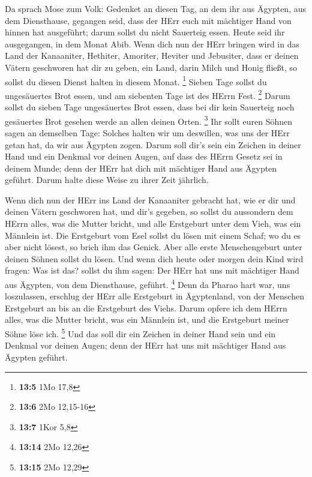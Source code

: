  Da sprach Mose zum Volk: Gedenket an diesen Tag, an dem ihr
aus Ägypten, aus dem Diensthause, gegangen seid, dass der HErr euch mit
mächtiger Hand von hinnen hat ausgeführt; darum sollst du nicht
Sauerteig essen.  Heute seid ihr ausgegangen, in dem Monat
Abib.  Wenn dich nun der HErr bringen wird in das Land der
Kanaaniter, Hethiter, Amoriter, Heviter und Jebusiter, dass er deinen
Vätern geschworen hat dir zu geben, ein Land, darin Milch und Honig
fließt, so sollst du diesen Dienst halten in diesem Monat. \footnote{\textbf{13:5}
  1Mo 17,8}  Sieben Tage sollst du ungesäuertes Brot essen,
und am siebenten Tage ist des HErrn Fest. \footnote{\textbf{13:6} 2Mo
  12,15-16}  Darum sollst du sieben Tage ungesäuertes Brot
essen, dass bei dir kein Sauerteig noch gesäuertes Brot gesehen werde an
allen deinen Orten. \footnote{\textbf{13:7} 1Kor 5,8}  Ihr
sollt euren Söhnen sagen an demselben Tage: Solches halten wir um
deswillen, was uns der HErr getan hat, da wir aus Ägypten zogen.
 Darum soll dir's sein ein Zeichen in deiner Hand und ein
Denkmal vor deinen Augen, auf dass des HErrn Gesetz sei in deinem Munde;
denn der HErr hat dich mit mächtiger Hand aus Ägypten geführt.
 Darum halte diese Weise zu ihrer Zeit jährlich.

 Wenn dich nun der HErr ins Land der Kanaaniter gebracht
hat, wie er dir und deinen Vätern geschworen hat, und dir's gegeben,
 so sollst du aussondern dem HErrn alles, was die Mutter
bricht, und alle Erstgeburt unter dem Vieh, was ein Männlein ist.
 Die Erstgeburt vom Esel sollst du lösen mit einem Schaf;
wo du es aber nicht lösest, so brich ihm das Genick. Aber alle erste
Menschengeburt unter deinen Söhnen sollst du lösen.  Und
wenn dich heute oder morgen dein Kind wird fragen: Was ist das? sollst
du ihm sagen: Der HErr hat uns mit mächtiger Hand aus Ägypten, von dem
Diensthause, geführt. \footnote{\textbf{13:14} 2Mo 12,26} 
Denn da Pharao hart war, uns loszulassen, erschlug der HErr alle
Erstgeburt in Ägyptenland, von der Menschen Erstgeburt an bis an die
Erstgeburt des Viehs. Darum opfere ich dem HErrn alles, was die Mutter
bricht, was ein Männlein ist, und die Erstgeburt meiner Söhne löse ich.
\footnote{\textbf{13:15} 2Mo 12,29}  Und das soll dir ein
Zeichen in deiner Hand sein und ein Denkmal vor deinen Augen; denn der
HErr hat uns mit mächtiger Hand aus Ägypten geführt.

